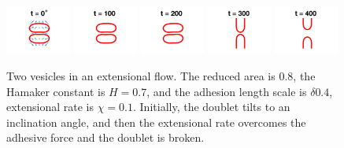 \documentclass[prf,superscriptaddress,showpacs]{revtex4-1}
\begin{document}
\begin{figure}[htp]
  \includegraphics[width = 0.19\textwidth]{figs/extensional_adR4em1adS7em1Chi1em1_ra080_image01.png}
  \includegraphics[width = 0.19\textwidth]{figs/extensional_adR4em1adS7em1Chi1em1_ra080_image02.png}
  \includegraphics[width = 0.19\textwidth]{figs/extensional_adR4em1adS7em1Chi1em1_ra080_image03.png}
  \includegraphics[width = 0.19\textwidth]{figs/extensional_adR4em1adS7em1Chi1em1_ra080_image04.png}
  \includegraphics[width = 0.19\textwidth]{figs/extensional_adR4em1adS7em1Chi1em1_ra080_image05.png}
  \caption{\label{fig:extensional3} Two vesicles in an extensional flow.
  The reduced area is $0.8$, the Hamaker constant is $H = 0.7$, and the
  adhesion length scale is $\delta0.4$, extensional rate is $\chi =
  0.1$.  Initially, the doublet tilts to an inclination angle, and then
  the extensional rate overcomes the adhesive force and the doublet is
  broken.}
\end{figure}
\end{document}
